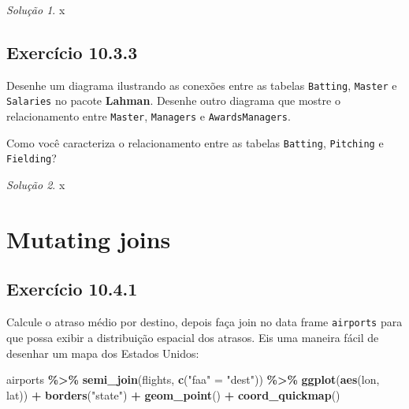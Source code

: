 \documentclass[
]{latex/krantz}
\newenvironment{Shaded}{\begin{snugshade}}{\end{snugshade}}
\newcommand{\FunctionTok}[1]{\textcolor[rgb]{0.13,0.29,0.53}{\textbf{#1}}}
\newcommand{\NormalTok}[1]{#1}
\newcommand{\OtherTok}[1]{\textcolor[rgb]{0.56,0.35,0.01}{#1}}
\newcommand{\SpecialCharTok}[1]{\textcolor[rgb]{0.81,0.36,0.00}{\textbf{#1}}}
\newcommand{\StringTok}[1]{\textcolor[rgb]{0.31,0.60,0.02}{#1}}
\theoremstyle{definition}
\theoremstyle{definition}
\theoremstyle{definition}
\theoremstyle{definition}
\theoremstyle{remark}
\newtheorem*{solution}{Solução}
\begin{document}
\begin{solution}
x
\end{solution}

\hypertarget{exr10-3-3}{%
\subsection*{Exercício 10.3.3}\label{exr10-3-3}}

Desenhe um diagrama ilustrando as conexões entre as tabelas \texttt{Batting}, \texttt{Master} e \texttt{Salaries} no pacote \textbf{Lahman}. Desenhe outro diagrama que mostre o relacionamento entre \texttt{Master}, \texttt{Managers} e \texttt{AwardsManagers}.

Como você caracteriza o relacionamento entre as tabelas \texttt{Batting}, \texttt{Pitching} e \texttt{Fielding}?

\begin{solution}
x
\end{solution}

\hypertarget{mutating-joins}{%
\section{Mutating joins}\label{mutating-joins}}

\hypertarget{exr10-4-1}{%
\subsection*{Exercício 10.4.1}\label{exr10-4-1}}

Calcule o atraso médio por destino, depois faça join no data frame \texttt{airports} para que possa exibir a distribuição espacial dos atrasos. Eis uma maneira fácil de desenhar um mapa dos Estados Unidos:

\begin{Shaded}
\begin{Highlighting}[]
\NormalTok{airports }\SpecialCharTok{\%\textgreater{}\%}
  \FunctionTok{semi\_join}\NormalTok{(flights, }\FunctionTok{c}\NormalTok{(}\StringTok{"faa"} \OtherTok{=} \StringTok{"dest"}\NormalTok{)) }\SpecialCharTok{\%\textgreater{}\%}
  \FunctionTok{ggplot}\NormalTok{(}\FunctionTok{aes}\NormalTok{(lon, lat)) }\SpecialCharTok{+}
    \FunctionTok{borders}\NormalTok{(}\StringTok{"state"}\NormalTok{) }\SpecialCharTok{+} 
    \FunctionTok{geom\_point}\NormalTok{() }\SpecialCharTok{+}
    \FunctionTok{coord\_quickmap}\NormalTok{()}
\end{Highlighting}
\end{Shaded}
\end{document}
